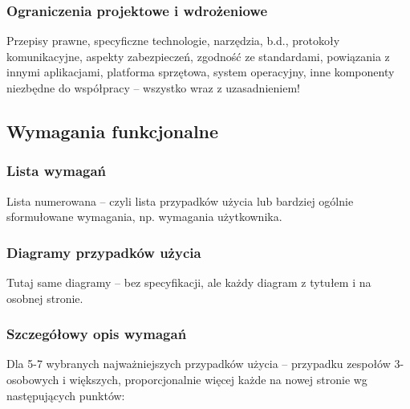 \documentclass[a4paper,12pt]{article}
\begin{document}
\subsubsection{Ograniczenia projektowe i wdrożeniowe}

Przepisy prawne, specyficzne technologie, narzędzia, b.d., protokoły komunikacyjne, aspekty zabezpieczeń, zgodność ze standardami, powiązania z innymi aplikacjami, platforma sprzętowa, system operacyjny, inne komponenty niezbędne do współpracy – wszystko wraz z uzasadnieniem!


\subsection{Wymagania funkcjonalne}


\subsubsection{Lista wymagań}

Lista numerowana – czyli lista przypadków użycia lub bardziej ogólnie sformułowane wymagania, np. wymagania użytkownika.

\subsubsection{Diagramy przypadków użycia}
Tutaj same diagramy – bez specyfikacji, ale każdy diagram z tytułem i na osobnej stronie.

\subsubsection{Szczegółowy opis wymagań}

Dla 5-7 wybranych najważniejszych przypadków użycia – przypadku zespołów 3-osobowych i większych, proporcjonalnie więcej
każde na nowej stronie wg następujących punktów:
\end{document}
